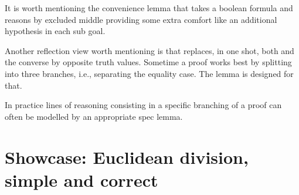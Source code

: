 It is worth mentioning the convenience lemma  that takes a boolean
formula and reasons by excluded middle providing some extra comfort
like an additional hypothesis in each sub goal.

Another reflection view worth mentioning is  that replaces, in one shot,
both \C{(_ <= _)} and the converse \C{(_ < _)} by opposite truth values.
Sometime a proof works best by splitting into three branches, i.e.,
separating the equality case. The  lemma is designed for that.

In practice lines of reasoning consisting in a specific branching of
a proof can often be modelled by an appropriate spec lemma.






\clearpage
\section{Showcase: Euclidean division, simple and correct}\label{sec:edivn}
\label{sec:realproofs}


